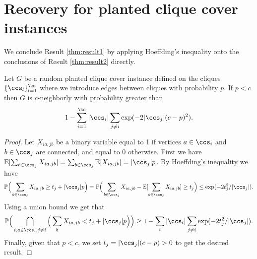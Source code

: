 \section{Recovery for planted clique cover instances} \label{sec:randomgraphs}


We conclude Result \ref{thm:result1} by applying Hoeffding's inequality onto the conclusions of Result \ref{thm:result2} directly.


\begin{theorem} \label{thm:uneq_random_cond}
Let $G$ be a random planted clique cover instance defined on the cliques $\{ \ccs_l \}_{l=1}^{\ks}$  where we introduce edges between cliques with probability $p$. 
If $p < c$ then $G$ is $c$-neighborly with probability greater than 
$$
1 - \sum_{i=1}^{\ks} {|\ccs_i| \sum_{j \neq i}\exp(-2|\ccs_j|(c-p)^2}).
$$
\end{theorem}

\begin{proof}
Let $X_{ia,jb}$ be a binary variable equal to 1 if vertices $a \in \ccs_i$ and $b\in \ccs_j$ are connected, and equal to 0 otherwise.  First we have $\mathbb{E}[\sum_{b \in \ccs_j}{X_{ia, jb}}] = \sum_{b \in \ccs_j}{\mathbb{E}[X_{ia, jb}]} = |\ccs_j|p$.
By Hoeffding's inequality we have
\begin{equation}\label{ineq:Hoeffding_U}
\mathbb{P} \Big(\sum_{b \in \ccs_j}{X_{ia, jb}}  \geq t_j + |\ccs_j|p \Big)  = \mathbb{P} \Big(\sum_{b \in \ccs_j}{X_{ia, jb}} - \mathbb{E}[\sum_{b \in \ccs_j}{X_{ia, jb}}] \geq t_j \Big) \leq \exp ( -2t_j^2 / |\ccs_j| ).
\end{equation}
Using a union bound we get that 
$$\mathbb{P} \Big( \bigcap _{i, a\in \ccs_i, j \ne i } \Big( \sum_{b}{X_{ia, jb}} <t_j + |\ccs_j|p \Big) \Big) \ge 1- \sum_i|\ccs_i|
\sum_{j\ne i}\exp(-2t_j^2/|\ccs_j|).$$
Finally, given that $p<c$, we set $t_j=|\ccs_j|(c-p)>0$ to get the desired result. 
\end{proof}


